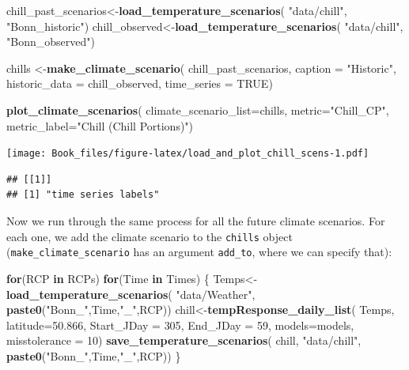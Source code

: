 \documentclass[
]{book}
\newenvironment{Shaded}{\begin{snugshade}}{\end{snugshade}}
\newcommand{\ControlFlowTok}[1]{\textcolor[rgb]{0.13,0.29,0.53}{\textbf{#1}}}
\newcommand{\DataTypeTok}[1]{\textcolor[rgb]{0.13,0.29,0.53}{#1}}
\newcommand{\DecValTok}[1]{\textcolor[rgb]{0.00,0.00,0.81}{#1}}
\newcommand{\FloatTok}[1]{\textcolor[rgb]{0.00,0.00,0.81}{#1}}
\newcommand{\KeywordTok}[1]{\textcolor[rgb]{0.13,0.29,0.53}{\textbf{#1}}}
\newcommand{\NormalTok}[1]{#1}
\newcommand{\OtherTok}[1]{\textcolor[rgb]{0.56,0.35,0.01}{#1}}
\newcommand{\StringTok}[1]{\textcolor[rgb]{0.31,0.60,0.02}{#1}}
\begin{document}
\begin{Shaded}
\begin{Highlighting}[]
\NormalTok{chill_past_scenarios<-}\KeywordTok{load_temperature_scenarios}\NormalTok{(}
  \StringTok{"data/chill"}\NormalTok{,}
  \StringTok{"Bonn_historic"}\NormalTok{)}
\NormalTok{chill_observed<-}\KeywordTok{load_temperature_scenarios}\NormalTok{(}
  \StringTok{"data/chill"}\NormalTok{,}
  \StringTok{"Bonn_observed"}\NormalTok{)}

\NormalTok{chills <-}\KeywordTok{make_climate_scenario}\NormalTok{(}
\NormalTok{  chill_past_scenarios,}
  \DataTypeTok{caption =} \StringTok{"Historic"}\NormalTok{,}
  \DataTypeTok{historic_data =}\NormalTok{ chill_observed,}
  \DataTypeTok{time_series =} \OtherTok{TRUE}\NormalTok{)}

\KeywordTok{plot_climate_scenarios}\NormalTok{(}
  \DataTypeTok{climate_scenario_list=}\NormalTok{chills,}
  \DataTypeTok{metric=}\StringTok{"Chill_CP"}\NormalTok{,}
  \DataTypeTok{metric_label=}\StringTok{"Chill (Chill Portions)"}\NormalTok{)}
\end{Highlighting}
\end{Shaded}

\texttt{[image: Book\_files/figure-latex/load\_and\_plot\_chill\_scens-1.pdf]}

\begin{verbatim}
## [[1]]
## [1] "time series labels"
\end{verbatim}

Now we run through the same process for all the future climate scenarios. For each one, we add the climate scenario to the \texttt{chills} object (\texttt{make\_climate\_scenario} has an argument \texttt{add\_to}, where we can specify that):

\begin{Shaded}
\begin{Highlighting}[]
\ControlFlowTok{for}\NormalTok{(RCP }\ControlFlowTok{in}\NormalTok{ RCPs)}
  \ControlFlowTok{for}\NormalTok{(Time }\ControlFlowTok{in}\NormalTok{ Times)}
\NormalTok{    \{}
\NormalTok{    Temps<-}\KeywordTok{load_temperature_scenarios}\NormalTok{(}
      \StringTok{"data/Weather"}\NormalTok{,}
      \KeywordTok{paste0}\NormalTok{(}\StringTok{"Bonn_"}\NormalTok{,Time,}\StringTok{"_"}\NormalTok{,RCP))}
\NormalTok{    chill<-}\KeywordTok{tempResponse_daily_list}\NormalTok{(}
\NormalTok{      Temps,}
      \DataTypeTok{latitude=}\FloatTok{50.866}\NormalTok{,}
      \DataTypeTok{Start_JDay =} \DecValTok{305}\NormalTok{,}
      \DataTypeTok{End_JDay =} \DecValTok{59}\NormalTok{,}
      \DataTypeTok{models=}\NormalTok{models,}
      \DataTypeTok{misstolerance =} \DecValTok{10}\NormalTok{)}
    \KeywordTok{save_temperature_scenarios}\NormalTok{(}
\NormalTok{      chill,}
      \StringTok{"data/chill"}\NormalTok{,}
      \KeywordTok{paste0}\NormalTok{(}\StringTok{"Bonn_"}\NormalTok{,Time,}\StringTok{"_"}\NormalTok{,RCP))}
\NormalTok{\}}
\end{Highlighting}
\end{Shaded}
\end{document}
